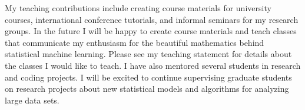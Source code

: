 \documentclass{article}
\begin{document}



My teaching contributions include creating course materials for
university courses, international conference tutorials, and informal
seminars for my research groups. In the future I will be happy to
create course materials and teach classes that communicate my
enthusiasm for the beautiful mathematics behind statistical machine
learning. Please
see my teaching statement for details about the
classes I would like to teach.
I have also mentored several students
in research and coding projects. I will be excited to continue
supervising graduate students on research projects about new
statistical models and algorithms for analyzing large 
data
sets. 
\end{document}
